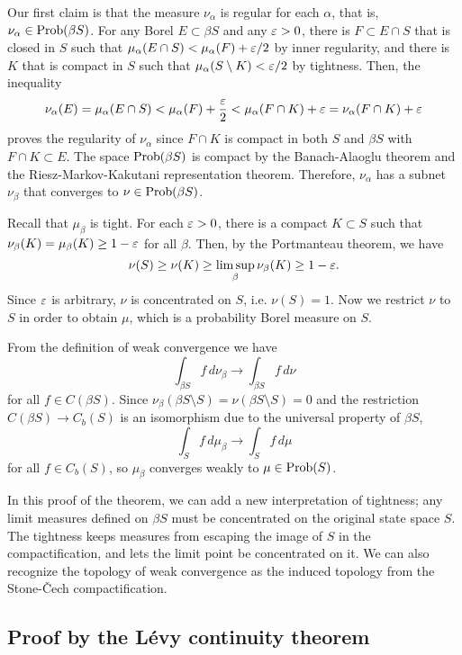 \documentclass{../../small}
\begin{document}
\begin{pf}
Our first claim is that the measure $\nu_\alpha$ is regular for each $\alpha$, that is, $\nu_\alpha\in\operatorname{Prob}(\beta S)$.
For any Borel $E\subset\beta S$ and any $\varepsilon>0$, there is $F\subset E\cap S$ that is closed in $S$ such that $\mu_\alpha(E\cap S)<\mu_\alpha(F)+\varepsilon/2$ by inner regularity, and there is $K$ that is compact in $S$ such that $\mu_\alpha(S\setminus K)<\varepsilon/2$ by tightness.
Then, the inequality
\[\nu_\alpha(E)=\mu_\alpha(E\cap S)<\mu_\alpha(F)+\frac{\varepsilon}2<\mu_\alpha(F\cap K)+\varepsilon=\nu_\alpha(F\cap K)+\varepsilon\]
proves the regularity of $\nu_\alpha$ since $F\cap K$ is compact in both $S$ and $\beta S$ with $F\cap K\subset E$.
The space $\operatorname{Prob}(\beta S)$ is compact by the Banach-Alaoglu theorem and the Riesz-Markov-Kakutani representation theorem.
Therefore, $\nu_\alpha$ has a subnet $\nu_\beta$ that converges to $\nu\in\operatorname{Prob}(\beta S)$.

Recall that $\mu_\beta$ is tight.
For each $\varepsilon>0$, there is a compact $K\subset S$ such that $\nu_\beta(K)=\mu_\beta(K)\ge1-\varepsilon$ for all $\beta$.
Then, by the Portmanteau theorem, we have
\[\nu(S)\ge\nu(K)\ge\limsup_\beta\nu_\beta(K)\ge1-\varepsilon.\]
Since $\varepsilon$ is arbitrary, $\nu$ is concentrated on $S$, i.e. $\nu(S)=1$.
Now we restrict $\nu$ to $S$ in order to obtain $\mu$, which is a probability Borel measure on $S$.

From the definition of weak convergence we have
\[\int_{\beta S}f\,d\nu_\beta\to\int_{\beta S}f\,d\nu\]
for all $f\in C(\beta S)$.
Since $\nu_\beta(\beta S\setminus S)=\nu(\beta S\setminus S)=0$ and the restriction $C(\beta S)\to C_b(S)$ is an isomorphism due to the universal property of $\beta S$,
\[\int_Sf\,d\mu_\beta\to\int_Sf\,d\mu\]
for all $f\in C_b(S)$, so $\mu_\beta$ converges weakly to $\mu\in\operatorname{Prob}(S)$.
\end{pf}

In this proof of the theorem, we can add a new interpretation of tightness; any limit measures defined on $\beta S$ must be concentrated on the original state space $S$.
The tightness keeps measures from escaping the image of $S$ in the compactification, and lets the limit point be concentrated on it.
We can also recognize the topology of weak convergence as the induced topology from the Stone-\v Cech compactification.



\subsection{Proof by the L\'evy continuity theorem}
\end{document}
